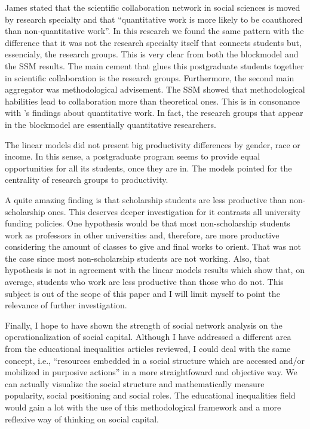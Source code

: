\documentclass[a4paper, 12pt, openright, oneside, article, german, french, brazil, english]{abntex2}
\begin{document}
James  stated that the scientific collaboration network in social sciences is moved by research specialty and that ``quantitative work is more likely to be coauthored than non-quantitative work''. In this research we found the same pattern with the difference that it was not the research specialty itself that connects students but, essencialy, the research groups. This is very clear from both the blockmodel and the SSM results. The main cement that glues this postgraduate students together in scientific collaboration is the research groups. Furthermore, the second main aggregator was methodological advisement. The SSM showed that methodological habilities lead to collaboration more than theoretical ones. This is in consonance with 's findings about quantitative work. In fact, the research groups that appear in the blockmodel are essentially quantitative researchers.

The linear models did not present big productivity differences by gender, race or income. In this sense, a postgraduate program seems to provide equal opportunities for all its students, once they are in. The models pointed for the centrality of research groups to productivity.

A quite amazing finding is that scholarship students are less productive than non-scholarship ones. This deserves deeper investigation for it contrasts all university funding policies. One hypothesis would be that most non-scholarship students work as professors in other universities and, therefore, are more productive considering the amount of classes to give and final works to orient. That was not the case since most non-scholarship students are not working. Also, that hypothesis is not in agreement with the linear models results which show that, on average, students who work are less productive than those who do not. This subject is out of the scope of this paper and I will limit myself to point the relevance of further investigation.

Finally, I hope to have shown the strength of social network analysis on the operationalization of social capital. Although I have addressed a different area from the educational inequalities articles reviewed, I could deal with the same concept, i.e., ``resources embedded in a social structure which are accessed and/or mobilized in purposive actions'' \cite[p. 35]{lin1999building} in a more straightfoward and objective way. We can actually visualize the social structure and mathematically measure popularity, social positioning and social roles. The educational inequalities field would gain a lot with the use of this methodological framework and a more reflexive way of thinking on social capital.






\end{document}
